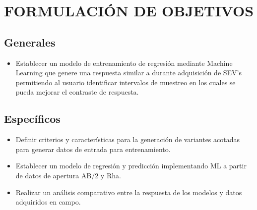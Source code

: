 \chapter{FORMULACIÓN DE OBJETIVOS}

\section{Generales}

\begin{itemize}

	\item Establecer un modelo de entrenamiento de regresión mediante Machine Learning que genere una respuesta similar a durante adquisición de SEV's permitiendo al usuario identificar intervalos de muestreo en los cuales se pueda mejorar el contraste de respuesta.
\end{itemize}

\section{Específicos}


\begin{itemize}
	\item Definir criterios y características para la generación de variantes acotadas para generar datos de entrada para entrenamiento.
	\item Establecer un modelo de regresión y predicción implementando ML a partir de datos de apertura AB/2 y Rha.
	\item Realizar un análisis comparativo entre la respuesta de los modelos y datos adquiridos en campo.
\end{itemize}
